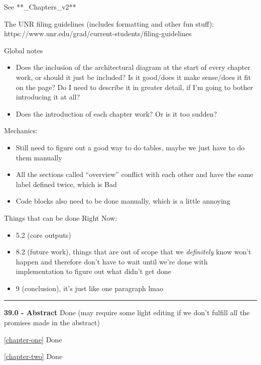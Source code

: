 See **\_Chapters\_v2**

The UNR filing guidelines (includes formatting and other fun stuff):
https://www.unr.edu/grad/current-students/filing-guidelines

Global notes

\begin{itemize}
\tightlist
\item
  Does the inclusion of the architectural diagram at the start of every
  chapter work, or should it just be included? Is it good/does it make
  sense/does it fit on the page? Do I need to describe it in greater
  detail, if I'm going to bother introducing it at all?
\item
  Does the introduction of each chapter work? Or is it too sudden?
\end{itemize}

Mechanics:

\begin{itemize}
\tightlist
\item
  Still need to figure out a good way to do tables, maybe we just have
  to do them manually
\item
  All the sections called ``overview'' conflict with each other and have
  the same label defined twice, which is Bad
\item
  Code blocks also need to be done manually, which is a little annoying
\end{itemize}

Things that can be done Right Now:

\begin{itemize}
\tightlist
\item
  5.2 (core outputs)
\item
  8.2 (future work), things that are out of scope that we
  \emph{definitely} know won't happen and therefore don't have to wait
  until we're done with implementation to figure out what didn't get
  done
\item
  9 (conclusion), it's just like one paragraph lmao
\end{itemize}

\begin{center}\rule{0.5\linewidth}{0.5pt}\end{center}

\textbf{39.0 - Abstract} Done (may require some light editing if we
don't fulfill all the promises made in the abstract)

\autoref{chapter-one} Done

\autoref{chapter-two} Done

